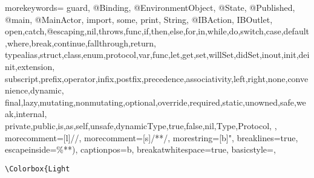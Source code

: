 %
%
%


\usepackage{xpatch,realboxes}
\usepackage{xcolor}
{
  morekeywords={ guard, @Binding, @EnvironmentObject, @State, @Published, @main, @MainActor, import, some, print, String, @IBAction, IBOutlet,
    open,catch,@escaping,nil,throws,func,if,then,else,for,in,while,do,switch,case,default,where,break,continue,fallthrough,return,
    typealias,struct,class,enum,protocol,var,func,let,get,set,willSet,didSet,inout,init,deinit,extension,
    subscript,prefix,operator,infix,postfix,precedence,associativity,left,right,none,convenience,dynamic,
    final,lazy,mutating,nonmutating,optional,override,required,static,unowned,safe,weak,internal,
    private,public,is,as,self,unsafe,dynamicType,true,false,nil,Type,Protocol,
  },
  morecomment=[l]{//}, %
  morecomment=[s]{/*}{*/}, %
  morestring=[b]", %
  breaklines=true,
  escapeinside={\%*}{*)},
  captionpos=b,
  breakatwhitespace=true,
  basicstyle=\linespread{1.0}\ttfamily\footnotesize, %
}


\makeatletter
\xpretocmd\lstinline{\Colorbox{Light}\bgroup\appto\lst@DeInit{\egroup}}{}{}
\makeatother


